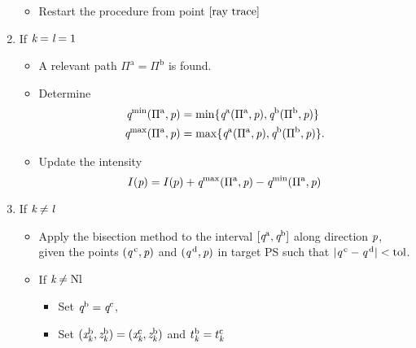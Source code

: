\begin{enumerate}
\begin{itemize}
\item Restart the procedure from point $\ref{ray trace}$
\end{itemize}
\item If $\textit{k}=\textit{l}= 1$ 
\begin{itemize}
\item A relevant path $\Pi^{\textrm{a}} = \Pi^{\textrm{b}}$ is found. 
\item Determine 
\begin{equation*}
\begin{aligned}
\textit{q}^{\textrm{min}}(\Pi^{\textrm{a}}, \textit{p})&=\min\{\textit{q}^{\textrm{a}}(\Pi^{\textrm{a}}, \textit{p}), \textit{q}^{\textrm{b}}(\Pi^{\textrm{b}}, \textit{p})\}\\ 
\textit{q}^{\textrm{max}}(\Pi^{\textrm{a}}, \textit{p})&=\max\{\textit{q}^{\textrm{a}}(\Pi^{\textrm{a}}, \textit{p}), \textit{q}^{\textrm{b}}(\Pi^{\textrm{b}}, \textit{p})\}.
\end{aligned}
\end{equation*}
\item Update the intensity $$I(\textit{p}) = I(p)+\textit{q}^{\textrm{max}}(\Pi^{\textrm{a}}, \textit{p})-\textit{q}^{\textrm{min}}(\Pi^{\textrm{a}}, \textit{p})$$
\end{itemize}
\item If $\textit{k}\neq\textit{l}$ 
\begin{itemize}
\item Apply the bisection method to the interval $[\textit{q}^{\textrm{a}}, \textit{q}^{\textrm{b}}]$ along direction $\textit{p}$, given the points $(\textit{q}^{\,\textrm{c}}, \textit{p})$ and $(\textit{q}^{\,\textrm{d}}, \textit{p})$ in target PS  such that $|\textit{q}^{\,\textrm{c}}-\textit{q}^{\,\textrm{d}}|<\textrm{tol}$. 
\item If $\textit{k}\neq\textrm{Nl}$
\begin{itemize}
\item Set $\textit{q}^{\textrm{b}} = \textit{q}^{\textrm{c}}$,
\item Set $(\textit{x}_{\textit{k}}^{\textrm{b}}, \textit{z}_{\textit{k}}^{\textrm{b}}) = (\textit{x}_{\textit{k}}^{\textrm{c}}, \textit{z}_{\textit{k}}^{\textrm{b}})$ and $t_{\textit{k}}^{\textrm{b}}= t_{\textit{k}}^{\textrm{c}}$

\end{itemize}
\end{itemize}
\end{enumerate}
